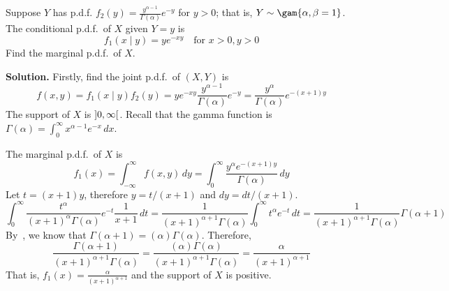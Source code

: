 \begin{Example}{}{}
    Suppose $ Y $ has p.d.f. $ \displaystyle f_2(y)=\frac{y^{\alpha-1}}{\Gamma(\alpha)}e^{-y} $
    for $ y>0 $; that is, $ Y \sim \gam{\alpha,\beta=1}$. The conditional
    p.d.f.\ of $ X $ given $ Y=y $ is
    \[ f_1(x\mid y)=ye^{-xy}\quad\text{for }x>0,y>0 \]
    Find the marginal p.d.f.\ of $ X $.

    \textbf{Solution.} Firstly, find the joint p.d.f.\ of $ (X,Y) $ is
    \[
        f(x,y)
        =f_1(x\mid y)f_2(y)
        =ye^{-x y} \frac{y^{\alpha-1}}{\Gamma(\alpha)}e^{-y}
        =\frac{y^{\alpha}}{\Gamma(\alpha)} e^{-(x+1)y}\]
    The support of $ X $ is $ \ointerval{0}{\infty} $. Recall that
    the gamma function is
    $ \displaystyle  \Gamma(\alpha)=\int_{0}^{\infty} x^{\alpha-1}e^{-x}\, d{x} $.

    The marginal p.d.f.\ of $ X $ is
    \[
        f_1(x)=\int_{-\infty}^{\infty} f(x,y)\, d{y}
        =\int_{0}^{\infty} \frac{y^\alpha e^{-(x+1)y}}{\Gamma(\alpha)} \, d{y} \]
    Let $ t=(x+1)y $, therefore $ y=t/(x+1) $ and $ dy=dt/(x+1) $.
    \[ \int_{0}^{\infty} \frac{t^\alpha}{(x+1)^\alpha \Gamma(\alpha)}e^{-t}\frac{1}{x+1} \, d{t}
        =\frac{1}{(x+1)^{\alpha+1}\Gamma(\alpha)}
        \int_{0}^{\infty} t^{\alpha}e^{-t}\, d{t}=
        \frac{1}{(x+1)^{\alpha+1}\Gamma(\alpha)}\Gamma(\alpha+1)  \]
    By~, we know that $ \Gamma(\alpha+1) =(\alpha)\Gamma(\alpha) $.
    Therefore,
    \[ \frac{\Gamma(\alpha+1)}{(x+1)^{\alpha+1}\Gamma(\alpha)}=
        \frac{(\alpha)\Gamma(\alpha)}{(x+1)^{\alpha+1}\Gamma(\alpha)}=
        \frac{\alpha}{(x+1)^{\alpha+1}} \]
    That is, $ \displaystyle  f_1(x)=\frac{\alpha}{(x+1)^{\alpha+1}} $
    and the support of $ X $ is positive.
\end{Example}
